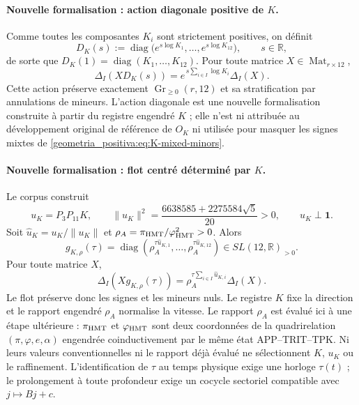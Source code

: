 \paragraph{Nouvelle formalisation : action diagonale positive de \(K\).}
Comme toutes les composantes \(K_i\) sont strictement positives, on définit
\begin{equation}
 D_K(s):=\operatorname{diag}
 \bigl(e^{s\log K_1},\ldots,e^{s\log K_{12}}\bigr),
 \qquad s\in\mathbb R,
 \label{geometria_positiva:eq:K-positive-diagonal-flow}
\end{equation}
de sorte que \(D_K(1)=\operatorname{diag}(K_1,\ldots,K_{12})\). Pour toute matrice \(X\in\operatorname{Mat}_{r\times12}\),
\begin{equation}
 \Delta_I(XD_K(s))
 =e^{\,s\sum_{i\in I}\log K_i}\Delta_I(X).
 \label{geometria_positiva:eq:K-diagonal-minors}
\end{equation}
Cette action préserve exactement \(\operatorname{Gr}_{\ge0}(r,12)\) et sa stratification par annulations de mineurs. L’action diagonale est une nouvelle formalisation construite à partir du registre engendré \(K\) ; elle n’est ni attribuée au développement original de référence de \(O_K\) ni utilisée pour masquer les signes mixtes de \eqref{geometria_positiva:eq:K-mixed-minors}.

\paragraph{Nouvelle formalisation : flot centré déterminé par \(K\).}
Le corpus construit
\begin{equation}
 u_K=P_3P_{11}K,\qquad
 \|u_K\|^2=
 \frac{6638585+2275584\sqrt5}{20}>0,
 \qquad u_K\perp\mathbf1.
 \label{geometria_positiva:eq:K-centered-direction}
\end{equation}
Soit \(\widehat u_K=u_K/\|u_K\|\) et \(\rho_A=\pi_{\rm HMT}/\varphi_{\rm HMT}^2>0\). Alors
\begin{equation}
 g_{K,\rho}(\tau)=
 \operatorname{diag}\!\left(
 \rho_A^{\tau\widehat u_{K,1}},\ldots,
 \rho_A^{\tau\widehat u_{K,12}}\right)
 \in SL(12,\mathbb R)_{>0}.
 \label{geometria_positiva:eq:K-centered-positive-flow}
\end{equation}
Pour toute matrice \(X\),
\begin{equation}
 \Delta_I(Xg_{K,\rho}(\tau))
 =\rho_A^{\tau\sum_{i\in I}\widehat u_{K,i}}\Delta_I(X).
 \label{geometria_positiva:eq:K-centered-flow-minors}
\end{equation}
Le flot préserve donc les signes et les mineurs nuls. Le registre \(K\) fixe la direction et le rapport engendré \(\rho_A\) normalise la vitesse. Le rapport \(\rho_A\) est évalué ici à une étape ultérieure : \(\pi_{\rm HMT}\) et \(\varphi_{\rm HMT}\) sont deux coordonnées de la quadrirelation \((\pi,\varphi,e,\alpha)\) engendrée coinductivement par le même état APP--TRIT--TPK\@. Ni leurs valeurs conventionnelles ni le rapport déjà évalué ne sélectionnent \(K\), \(u_K\) ou le raffinement. L’identification de \(\tau\) au temps physique exige une horloge \(\tau(t)\) ; le prolongement à toute profondeur exige un cocycle sectoriel compatible avec \(j\mapsto Bj+c\).

